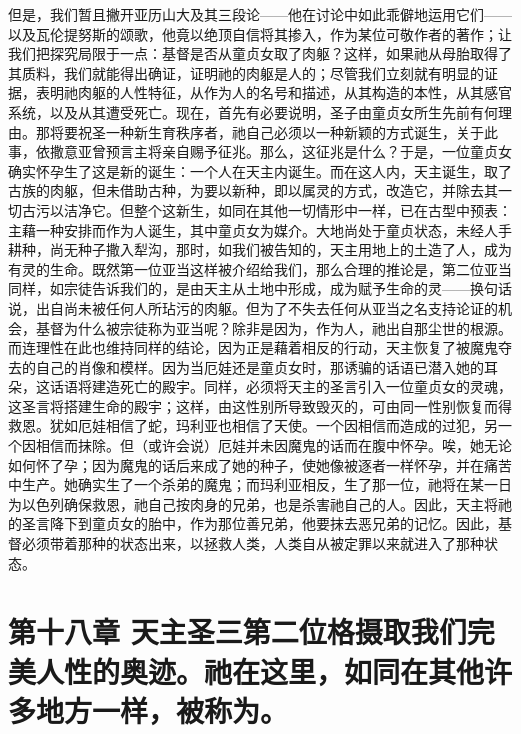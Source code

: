 但是，我们暂且撇开亚历山大及其三段论——他在讨论中如此乖僻地运用它们——以及瓦伦提努斯的颂歌，他竟以绝顶自信将其掺入，作为某位可敬作者的著作；让我们把探究局限于一点：基督是否从童贞女取了肉躯？这样，如果祂从母胎取得了其质料，我们就能得出确证，证明祂的肉躯是人的；尽管我们立刻就有明显的证据，表明祂肉躯的人性特征，从作为人的名号和描述，从其构造的本性，从其感官系统，以及从其遭受死亡。现在，首先有必要说明，圣子由童贞女所生先前有何理由。那将要祝圣一种新生育秩序者，祂自己必须以一种新颖的方式诞生，关于此事，依撒意亚曾预言主将亲自赐予征兆。那么，这征兆是什么？于是，一位童贞女确实怀孕生了这是新的诞生：一个人在天主内诞生。而在这人内，天主诞生，取了古族的肉躯，但未借助古种，为要以新种，即以属灵的方式，改造它，并除去其一切古污以洁净它。但整个这新生，如同在其他一切情形中一样，已在古型中预表：主藉一种安排而作为人诞生，其中童贞女为媒介。大地尚处于童贞状态，未经人手耕种，尚无种子撒入犁沟，那时，如我们被告知的，天主用地上的土造了人，成为有灵的生命。既然第一位亚当这样被介绍给我们，那么合理的推论是，第二位亚当同样，如宗徒告诉我们的，是由天主从土地中形成，成为赋予生命的灵——换句话说，出自尚未被任何人所玷污的肉躯。但为了不失去任何从亚当之名支持论证的机会，基督为什么被宗徒称为亚当呢？除非是因为，作为人，祂出自那尘世的根源。而连理性在此也维持同样的结论，因为正是藉着相反的行动，天主恢复了被魔鬼夺去的自己的肖像和模样。因为当厄娃还是童贞女时，那诱骗的话语已潜入她的耳朵，这话语将建造死亡的殿宇。同样，必须将天主的圣言引入一位童贞女的灵魂，这圣言将搭建生命的殿宇；这样，由这性别所导致毁灭的，可由同一性别恢复而得救恩。犹如厄娃相信了蛇，玛利亚也相信了天使。一个因相信而造成的过犯，另一个因相信而抹除。但（或许会说）厄娃并未因魔鬼的话而在腹中怀孕。唉，她无论如何怀了孕；因为魔鬼的话后来成了她的种子，使她像被逐者一样怀孕，并在痛苦中生产。她确实生了一个杀弟的魔鬼；而玛利亚相反，生了那一位，祂将在某一日为以色列确保救恩，祂自己按肉身的兄弟，也是杀害祂自己的人。因此，天主将祂的圣言降下到童贞女的胎中，作为那位善兄弟，他要抹去恶兄弟的记忆。因此，基督必须带着那种的状态出来，以拯救人类，人类自从被定罪以来就进入了那种状态。\par


\section{第十八章 天主圣三第二位格摄取我们完美人性的奥迹。祂在这里，如同在其他许多地方一样，被称为。}

